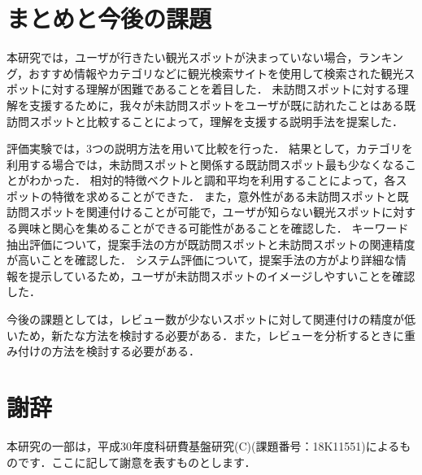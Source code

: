 \documentclass{deimj}
\begin{document}
\section{まとめと今後の課題}
\label{sec:まとめと今後の課題}

本研究では，ユーザが行きたい観光スポットが決まっていない場合，ランキング，おすすめ情報やカテゴリなどに観光検索サイトを使用して検索された観光スポットに対する理解が困難であることを着目した．
未訪問スポットに対する理解を支援するために，我々が未訪問スポットをユーザが既に訪れたことはある既訪問スポットと比較することによって，理解を支援する説明手法を提案した．

評価実験では，3つの説明方法を用いて比較を行った．
結果として，カテゴリを利用する場合では，未訪問スポットと関係する既訪問スポット最も少なくなることがわかった．
相対的特徴ベクトルと調和平均を利用することによって，各スポットの特徴を求めることができた．
また，意外性がある未訪問スポットと既訪問スポットを関連付けることが可能で，ユーザが知らない観光スポットに対する興味と関心を集めることができる可能性があることを確認した．
キーワード抽出評価について，提案手法の方が既訪問スポットと未訪問スポットの関連精度が高いことを確認した．
システム評価について，提案手法の方がより詳細な情報を提示しているため，ユーザが未訪問スポットのイメージしやすいことを確認した．

今後の課題としては，レビュー数が少ないスポットに対して関連付けの精度が低いため，新たな方法を検討する必要がある．また，レビューを分析するときに重み付けの方法を検討する必要がある．


\section*{謝辞}
本研究の一部は，平成30年度科研費基盤研究(C)(課題番号：18K11551)によるものです．ここに記して謝意を表すものとします．
\end{document}
